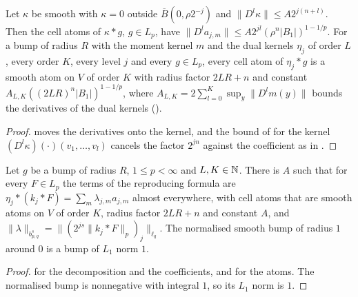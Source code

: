 \begin{lemma}
\label{lem:cell-atoms-smooth}
\leanok
{}
Let $\kappa$ be smooth with $\kappa = 0$ outside $\overline{B}(0, \rho 2^{-j})$ and
$\|D^l \kappa\| \leq A 2^{j(n+l)}$. Then the cell atoms of $\kappa * g$, $g \in L_p$, have
$\|D^l a_{j,m}\| \leq A 2^{jl} (\rho^n |B_1|)^{1-1/p}$. For a bump of radius $R$ with the moment
kernel $m$ and the dual kernels $\eta_j$ of order $L$, every order $K$, every level $j$ and every
$g \in L_p$, every cell atom of $\eta_j * g$ is a smooth atom on $V$ of order $K$ with radius
factor $2LR + n$ and constant $A_{L,K} ((2LR)^n |B_1|)^{1-1/p}$, where
$A_{L,K} = 2 \sum_{l=0}^K \sup_y \|D^l m(y)\|$ bounds the derivatives of the dual kernels
().
\end{lemma}

\begin{proof}
\leanok
{} moves the derivatives onto the kernel, and the bound of
 for the kernel $(D^l \kappa)(\cdot)(v_1, \dots, v_l)$ cancels the factor
$2^{jn}$ against the coefficient as in .
\end{proof}

\begin{theorem}
\label{thm:smooth-atomic-decomposition}
\leanok
{}
Let $g$ be a bump of radius $R$, $1 \leq p < \infty$ and $L, K \in \mathbb{N}$. There is $A$ such that for
every $F \in L_p$ the terms of the reproducing formula are
$\eta_j * (k_j * F) = \sum_m \lambda_{j,m} a_{j,m}$ almost everywhere, with cell atoms that are
smooth atoms on $V$ of order $K$, radius factor $2LR + n$ and constant $A$, and
$\|\lambda\|_{b^s_{p,q}} = \|(2^{js} \|k_j * F\|_p)_j\|_{\ell_q}$. The normalised smooth bump of
radius $1$ around $0$ is a bump of $L_1$ norm $1$.
\end{theorem}

\begin{proof}
\leanok
{} for the decomposition and the coefficients, and
 for the atoms. The normalised bump is nonnegative with integral
$1$, so its $L_1$ norm is $1$.
\end{proof}

